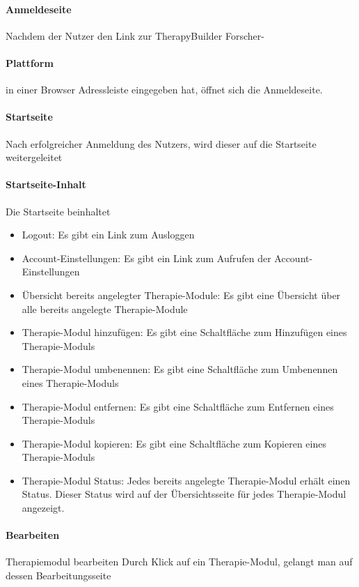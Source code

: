 \paragraph{Anmeldeseite} Nachdem der Nutzer den Link zur TherapyBuilder Forscher-\paragraph{Plattform} in einer Browser Adressleiste eingegeben hat, öffnet sich die Anmeldeseite.

\paragraph{Startseite}Nach erfolgreicher Anmeldung des Nutzers, wird dieser auf die Startseite weitergeleitet
\paragraph{Startseite-Inhalt}Die Startseite beinhaltet
\begin{itemize}
\item Logout: Es gibt ein Link zum Ausloggen
\item Account-Einstellungen: Es gibt ein Link zum Aufrufen der Account-Einstellungen
\item Übersicht bereits angelegter Therapie-Module: Es gibt eine Übersicht über alle bereits angelegte Therapie-Module
\item Therapie-Modul hinzufügen: Es gibt eine Schaltfläche zum Hinzufügen eines Therapie-Moduls
\item Therapie-Modul umbenennen:	Es gibt eine Schaltfläche zum Umbenennen eines Therapie-Moduls
\item Therapie-Modul entfernen:	Es gibt eine Schaltfläche zum Entfernen eines Therapie-Moduls
\item  Therapie-Modul kopieren:	Es gibt eine Schaltfläche zum Kopieren eines Therapie-Moduls
\item Therapie-Modul Status: Jedes bereits angelegte Therapie-Modul erhält einen Status. Dieser Status wird auf der Übersichtsseite für jedes Therapie-Modul angezeigt.
\end{itemize}
	
\paragraph{Bearbeiten} Therapiemodul bearbeiten	Durch Klick auf ein Therapie-Modul, gelangt man auf dessen Bearbeitungsseite
		
